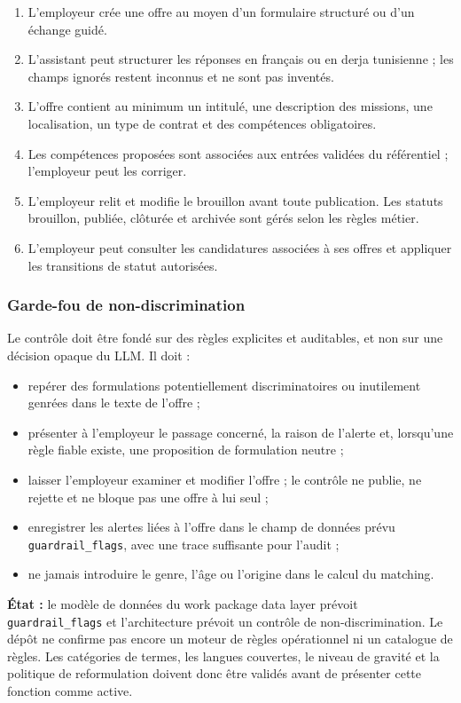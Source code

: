 \documentclass[11pt,a4paper]{article}
\newcommand{\code}[1]{\texttt{#1}}
\begin{document}
\begin{enumerate}
  \item L'employeur crée une offre au moyen d'un formulaire structuré ou d'un échange guidé.
  \item L'assistant peut structurer les réponses en français ou en derja tunisienne ; les champs ignorés restent inconnus et ne sont pas inventés.
  \item L'offre contient au minimum un intitulé, une description des missions, une localisation, un type de contrat et des compétences obligatoires.
  \item Les compétences proposées sont associées aux entrées validées du référentiel ; l'employeur peut les corriger.
  \item L'employeur relit et modifie le brouillon avant toute publication. Les statuts brouillon, publiée, clôturée et archivée sont gérés selon les règles métier.
  \item L'employeur peut consulter les candidatures associées à ses offres et appliquer les transitions de statut autorisées.
\end{enumerate}

\subsubsection{Garde-fou de non-discrimination}

Le contrôle doit être fondé sur des règles explicites et auditables, et non sur une décision opaque du LLM. Il doit :
\begin{itemize}
  \item repérer des formulations potentiellement discriminatoires ou inutilement genrées dans le texte de l'offre ;
  \item présenter à l'employeur le passage concerné, la raison de l'alerte et, lorsqu'une règle fiable existe, une proposition de formulation neutre ;
  \item laisser l'employeur examiner et modifier l'offre ; le contrôle ne publie, ne rejette et ne bloque pas une offre à lui seul ;
  \item enregistrer les alertes liées à l'offre dans le champ de données prévu \code{guardrail\_flags}, avec une trace suffisante pour l'audit ;
  \item ne jamais introduire le genre, l'âge ou l'origine dans le calcul du matching.
\end{itemize}

\textbf{État :} le modèle de données du work package data layer prévoit \code{guardrail\_flags} et l'architecture prévoit un contrôle de non-discrimination. Le dépôt ne confirme pas encore un moteur de règles opérationnel ni un catalogue de règles. Les catégories de termes, les langues couvertes, le niveau de gravité et la politique de reformulation doivent donc être validés avant de présenter cette fonction comme active.
\end{document}
